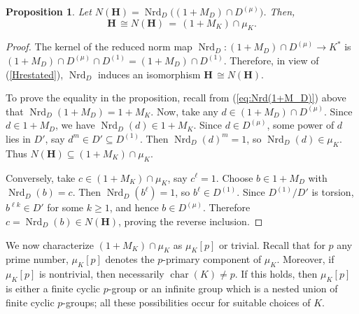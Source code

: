 \documentclass[11pt]{article}
\numberwithin{equation}{section}
\theoremstyle{plain}
\newtheorem{proposition}[theorem]{Proposition}
\theoremstyle{remark}
\newcommand{\opn}{\operatorname}
\newcommand{\Dmu}{D^{(\mu)}}
\newcommand{\Nrd}{\opn{Nrd}}
\newcommand{\charr}{\opn{char}}
\newcommand{\upone}{{(1)}}
\newcommand{\bH}{\mathbf{H}}
\begin{document}
\begin{proposition}
\label{prop:obstruction-norm}  Let $N(\bH) = \Nrd_D\big((1+M_D)\cap \Dmu\big)$. Then,
$$
\bH\, \cong N(\bH) \, = \, (1+M_K)\cap\mu_K.
$$
\end{proposition}
\begin{proof}
The kernel of the reduced norm map $\Nrd_D\colon (1+M_D)\cap \Dmu\to K^*$ is 
$(1+M_D)\cap \Dmu\cap D^\upone
= (1+M_D)\cap D^\upone$.  Therefore, in view of (\ref{Hrestated}),  $\Nrd_D$ induces an isomorphism 
$\bH\, \cong N(\bH)$. 
 
To prove the equality in the proposition, recall from (\ref{eq:Nrd(1+M_D)}) above  that 
$\operatorname{Nrd}_D(1+M_D)=1+M_K$. Now, take any 
$d\in(1+M_D)\cap \Dmu$. Since $d\in1+M_D$, we have $\operatorname{Nrd}_D(d)\in1+M_K$. Since $d\in \Dmu$, 
some power of $d$ lies in $D'$, say $d^m\in D'\subseteq D^{(1)}$. Then $\operatorname{Nrd}_D(d)^m=1$, so $\operatorname{Nrd}_D(d)\in\mu_K$. Thus $N(\mathbf{H})\subseteq(1+M_K)\cap\mu_K$.

Conversely, take $c\in(1+M_K)\cap\mu_K$, say $c^\ell=1$. Choose $b\in1+M_D$ with $\operatorname{Nrd}_D(b)=c$. 
Then $\operatorname{Nrd}_D(b^\ell)=1$, so $b^\ell\in D^{(1)}$. Since $D^{(1)}/D'$ is torsion, $b^{\ell k}\in D'$ for 
some $k\geq1$, and hence $b\in \Dmu$. Therefore $c=\operatorname{Nrd}_D(b)\in N(\mathbf{H})$, proving the 
reverse inclusion.
\end{proof}

We now characterize $(1+M_K)\cap\mu_K$ as $\mu_K[p]$ or trivial.  Recall that for  $p$  any prime number,
$\mu_K[p]$ denotes the $p$-primary component of $\mu_K$.  Moreover, if  $\mu_K[p]$ is nontrivial,
then necessarily ${\charr(K) \ne p}$. If this holds, then  $\mu_K[p]$ is either a finite cyclic $p$-group or an 
infinite group which is a nested union of finite cyclic $p$-groups; all these possibilities occur for 
suitable choices of $K$.
\end{document}
